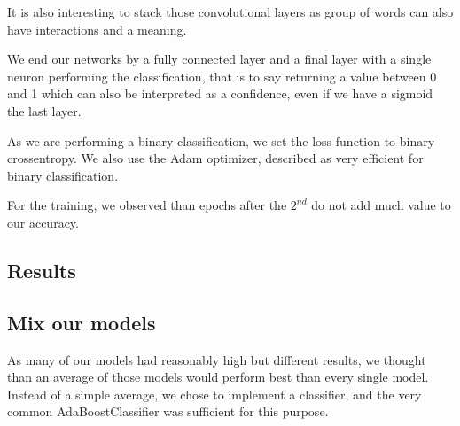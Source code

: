 \documentclass[10pt,conference,compsocconf]{IEEEtran}
\begin{document}
It is also interesting to stack those convolutional layers as group of words can also have interactions and a meaning.

We end our networks by a fully connected layer and a final layer with a single neuron performing the classification, that is to say returning a value between 0 and 1 which can also be interpreted as a confidence, even if we have a sigmoid the last layer.

As we are performing a binary classification, we set the loss function to binary crossentropy. We also use the Adam optimizer, described as very efficient for binary classification.

For the training, we observed than epochs after the $2^{nd}$ do not add much value to our accuracy.

\subsection{Results}

\subsection{Mix our models}

As many of our models had reasonably high but different results, we thought than an average of those models would perform best than every single model. Instead of a simple average, we chose to implement a classifier, and the very common AdaBoostClassifier was sufficient for this purpose.
\end{document}
